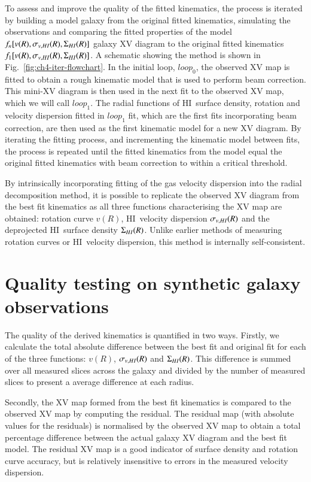 \documentclass[traditabstract]{aa} %
\newcommand\HI{H{\small I}}
\begin{document}
To assess and improve the quality of the fitted kinematics, 
the process is iterated
by building a model galaxy from the original fitted kinematics,
simulating the observations and comparing the fitted properties of the
model $f_n[v(R),\sigma_{v,\HI}(R),\Sigma_{\HI}(R)]$ galaxy XV diagram to the
original fitted kinematics
$f_1[v(R),\sigma_{v,\HI}(R),\Sigma_{\HI}(R)]$. A schematic showing the
method is shown in Fig.~\ref{fig:ch4-iter-flowchart}. In the initial
loop, $loop_0$, the observed XV map is fitted to obtain a rough kinematic
model that is used to perform beam correction. This mini-XV diagram is then
used in the next fit to the observed XV map, which we will call $loop_1$. The
radial functions of \HI\ surface density, rotation and velocity 
dispersion fitted in 
$loop_1$ fit, which are the first fits incorporating beam correction, 
are then used as
the first kinematic model for a new XV diagram. By iterating the fitting 
process, 
and incrementing the kinematic model between fits, the process is repeated 
until the fitted kinematics from the model equal the original
fitted kinematics with beam correction to within a critical threshold.

By intrinsically incorporating fitting of the gas velocity dispersion
into the radial decomposition method, it is possible to replicate the observed
XV diagram from the best fit kinematics as all three functions characterising
the XV map are obtained: rotation curve $v(R)$, \HI\ velocity
dispersion $\sigma_{v,\HI}(R)$ and the deprojected \HI\ surface density
$\Sigma_{\HI}(R)$. Unlike earlier methods of measuring rotation curves or
\HI\ velocity dispersion, this method is internally self-consistent.




\section{Quality testing on synthetic galaxy observations}
\label{sec:quality-test}


The quality of the derived kinematics is quantified in two ways.
Firstly, we calculate the total absolute difference between the best fit and
original fit for each of the three functions: $v(R)$,
$\sigma_{v,\HI}(R)$ and $\Sigma_{\HI}(R)$. This difference is
summed over all measured slices across the galaxy and divided by the
number of measured slices to present a average difference at each radius.

Secondly, the XV map formed from the best fit kinematics is compared
to the observed XV map by computing the residual. The residual map 
(with absolute values for the residuals) is
normalised by the observed XV map to obtain a total percentage
difference between the actual galaxy XV diagram and the best fit model. The
residual XV map is a good indicator of surface density and rotation
curve accuracy, but is relatively insensitive to errors in the
measured velocity dispersion.
\end{document}
